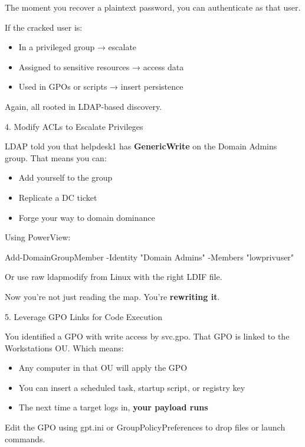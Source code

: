 The moment you recover a plaintext password, you can authenticate as that user.

If the cracked user is:

\begin{itemize}
    \item In a privileged group → escalate

    \item Assigned to sensitive resources → access data

    \item Used in GPOs or scripts → insert persistence

\end{itemize}
Again, all rooted in LDAP-based discovery.

4. Modify ACLs to Escalate Privileges

LDAP told you that helpdesk1 has \textbf{GenericWrite} on the Domain Admins group. That means you can:

\begin{itemize}
    \item Add yourself to the group

    \item Replicate a DC ticket

    \item Forge your way to domain dominance

\end{itemize}
Using PowerView:
 
Add-DomainGroupMember -Identity "Domain Admins" -Members "lowprivuser"

Or use raw ldapmodify from Linux with the right LDIF file.

Now you're not just reading the map. You’re \textbf{rewriting it}.

5. Leverage GPO Links for Code Execution

You identified a GPO with write access by svc.gpo. That GPO is linked to the Workstations OU. Which means:

\begin{itemize}
    \item Any computer in that OU will apply the GPO

    \item You can insert a scheduled task, startup script, or registry key

    \item The next time a target logs in, \textbf{your payload runs}

\end{itemize}
Edit the GPO using gpt.ini or GroupPolicyPreferences to drop files or launch commands.

